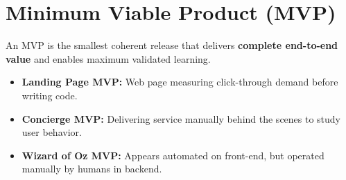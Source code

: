 \section{Minimum Viable Product (MVP)}

\begin{formulabox}
An MVP is the smallest coherent release that delivers \textbf{complete end-to-end value} and enables maximum validated learning.
\begin{itemize}[leftmargin=1.2em, itemsep=2pt]
    \item \textbf{Landing Page MVP:} Web page measuring click-through demand before writing code.
    \item \textbf{Concierge MVP:} Delivering service manually behind the scenes to study user behavior.
    \item \textbf{Wizard of Oz MVP:} Appears automated on front-end, but operated manually by humans in backend.
\end{itemize}
\end{formulabox}
